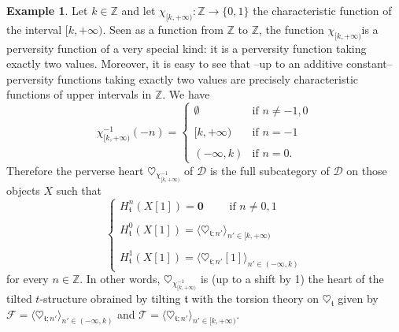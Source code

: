 \documentclass{article}
\theoremstyle{definition}
\newtheorem{exmp}[thm]{Example}
\newcommand{\Z}{\mathbb{Z}}
\newcommand{\tee}{\mathfrak{t}}
\begin{document}
\begin{exmp}
Let $k\in \Z$ and let $\chi_{[k,+\infty)}\colon \Z\to \{0,1\}$ the characteristic function of the interval $[k,+\infty)$. Seen as a function from $\Z$ to $\Z$, the function $\chi_{[k,+\infty)}$is a perversity function of a very special kind: it is a perversity function taking exactly two values. Moreover, it is easy to see that --up to an additive constant-- perversity functions taking exactly two values are precisely characteristic functions of upper intervals in $\Z$. We have
\[
\chi_{[k,+\infty)}^{-1}(-n)=\begin{cases}
\emptyset &\text{if }n\neq -1,0\\
\\
[k,+\infty)&\text{if }n= -1\\
\\
(-\infty,k)&\text{if }n =0.
\end{cases}
\]
Therefore the perverse heart $\heartsuit_{\chi_{[k,+\infty)}^{-1}}$ of $\mathscr{D}$ is the full subcategory of $\mathscr{D}$ on those objects $X$ such that 
\[
\begin{cases}
H_\tee^{n}(X[1])= \mathbf{0} \qquad \text{ if }n\neq 0,1 \\
\\
H_\tee^{0}(X[1])= \langle \heartsuit_{\tee;n'}\rangle_{n'\in [k,+\infty)}\\
\\
H_\tee^{1}(X[1])= \langle \heartsuit_{\tee;n'}[1]\rangle_{n'\in (-\infty,k)}
\end{cases}
\]
for every $n\in \Z$. In other words, $\heartsuit_{\chi_{[k,+\infty)}^{-1}}$ is (up to a shift by 1) the heart of the tilted $t$-structure obrained by tilting $\tee$ with the torsion theory on $\heartsuit_\tee$ given by $\mathcal{F}=\langle \heartsuit_{\tee;n'}\rangle_{n'\in (-\infty,k)}$ and $\mathcal{T}=\langle \heartsuit_{\tee;n'}\rangle_{n'\in [k,+\infty)}$.
\end{exmp}
\end{document}
